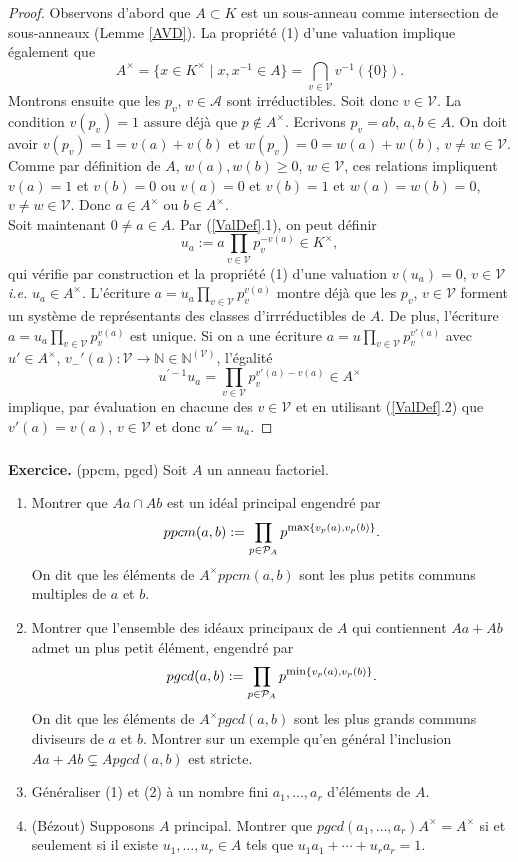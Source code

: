 \documentclass[a4paper, 12pt]{amsart}
\newcommand{\N}{\mathbb{N}}
\begin{document}
\begin{proof}Observons d'abord que  $A\subset K$ est un sous-anneau comme intersection de sous-anneaux (Lemme \ref{AVD}). La propriété (1) d'une valuation implique également que $$A^\times=\lbrace x\in K^\times\;|\; x,x^{-1}\in A\rbrace =\displaystyle{\bigcap_{v\in\mathcal{V}}v^{-1}(\lbrace 0\rbrace)}.$$  
 Montrons ensuite que les $p_v$, $v\in\mathcal{A}$ sont irréductibles.  Soit donc $v\in \mathcal{V}$. La condition $v(p_v)=1$ assure déjà que $p\notin A^\times$. Ecrivons $p_v=ab$, $a,b\in A$. On doit avoir $v(p_v)=1=v(a)+v(b)$ et $w(p_v)=0=w(a)+w(b)$, $v\not=w\in\mathcal{V}$. Comme par définition de $A$, $w(a),w(b)\geq 0$, $w\in\mathcal{V}$, ces relations impliquent $v(a)=1$ et $v(b)=0$ ou $v(a)=0$ et $v(b)=1$ et $w(a)=w(b)=0$, $v\not=w\in\mathcal{V}$. Donc $a\in A^\times$ ou $b\in A^\times$.\\
 Soit maintenant $0\not=a\in A$. Par (\ref{ValDef}.1), on peut définir  $$u_a:=a\prod_{v\in\mathcal{V}}p_v^{-v(a)}\in K^\times,$$
qui vérifie par construction et la propriété (1) d'une valuation $v(u_a)=0$, $v\in\mathcal{V}$ \textit{i.e.} $u_a\in A^\times$. L'écriture  $a=u_a\prod_{v\in\mathcal{V}}p_v^{v(a)}$ montre déjà que les $p_v$, $v\in\mathcal{V}$ forment  un système de représentants des classes d'irrréductibles de $A$. De plus, l'écriture $a=u_a\prod_{v\in\mathcal{V}}p_v^{v(a)}$ est unique.  Si on a une écriture $a=u\prod_{v\in\mathcal{V}}p_v^{v'(a)}$
avec $u'\in A^\times$, $v_-'(a):\mathcal{V}\rightarrow \N\in\N^{(\mathcal{V})}$, l'égalité
 $$u^{'-1} u_a=\prod_{v\in\mathcal{V}}p_v^{v'(a)-v(a)}\in A^\times$$
implique, par évaluation en chacune des $v\in\mathcal{V}$ et en utilisant (\ref{ValDef}.2) que $v'(a)=v(a)$, $v\in\mathcal{V}$ et donc $u'=u_a$.
\end{proof}

\subsubsection{}\textbf{Exercice.} (ppcm, pgcd) Soit $A$ un anneau factoriel. 
\begin{enumerate}
\item Montrer que $Aa\cap Ab$ est un idéal principal engendré par 
$$ppcm(a, b):=\prod_{p\in\mathcal{P}_A}p^{\hbox{\rm \footnotesize max}\lbrace v_p(a),v_p(b)\rbrace}.$$
On dit que les éléments de $A^\times ppcm(a, b) $ sont les plus petits communs multiples de $a$ et $b$.
\item Montrer que l'ensemble des idéaux principaux de $A$ qui contiennent $Aa+ Ab$ admet un plus petit élément, engendré par
$$pgcd(a, b):=\prod_{p\in\mathcal{P}_A}p^{\hbox{\rm \footnotesize min}\lbrace v_p(a),v_p(b)\rbrace}.$$
On dit que les éléments de $A^\times pgcd(a, b) $ sont les plus grands communs diviseurs de $a$ et $b$. Montrer sur un exemple qu'en général l'inclusion $Aa+Ab\subsetneq Apgcd(a,b)$ est stricte.
\item Généraliser  (1) et (2) à un nombre fini $a_1,\dots, a_r$ d'éléments de $A$.
\item (Bézout) Supposons $A$ principal. Montrer que $pgcd(a_1,\dots, a_r)A^\times= A^\times$ si et seulement si il existe $u_1,\dots, u_r\in A$ tels que $u_1a_1+\cdots+u_ra_r=1$.
\end{enumerate}
\end{document}
